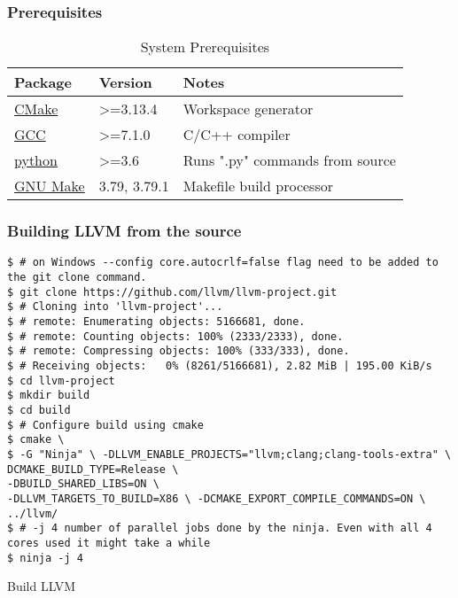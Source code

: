 \subsubsection{Prerequisites}

\begin{table}[H]
    \centering
    \begin{tabular}{|m{}|m{}| m{}|}
        \hline
        \textbf{Package} & \textbf{Version} & \textbf{Notes} \\ 
        \hline
        \href{https://cmake.org/}{CMake} & >=3.13.4	& Workspace generator \\ 
        \hline
        \href{https://gcc.gnu.org/}{GCC} & >=7.1.0 & C/C++ compiler \\ 
        \hline
        \href{https://python.com}{python} & >=3.6 & Runs ".py" commands from source  \\ 
        \hline
        \href{http://savannah.gnu.org/projects/make}{GNU Make} & 3.79, 3.79.1 & Makefile build processor \\ 
        \hline
    \end{tabular}
    \caption{System Prerequisites}
    \label{tab:prerequisites}
\end{table}


\subsubsection{Building LLVM from the source}

\begin{listing}[H]
\begin{verbatim}
$ # on Windows --config core.autocrlf=false flag need to be added to the git clone command.
$ git clone https://github.com/llvm/llvm-project.git
$ # Cloning into 'llvm-project'...
$ # remote: Enumerating objects: 5166681, done.
$ # remote: Counting objects: 100% (2333/2333), done.
$ # remote: Compressing objects: 100% (333/333), done.
$ # Receiving objects:   0% (8261/5166681), 2.82 MiB | 195.00 KiB/s
$ cd llvm-project
$ mkdir build 
$ cd build
$ # Configure build using cmake
$ cmake \
$ -G "Ninja" \ -DLLVM_ENABLE_PROJECTS="llvm;clang;clang-tools-extra" \  DCMAKE_BUILD_TYPE=Release \
-DBUILD_SHARED_LIBS=ON \
-DLLVM_TARGETS_TO_BUILD=X86 \ -DCMAKE_EXPORT_COMPILE_COMMANDS=ON \
../llvm/
$ # -j 4 number of parallel jobs done by the ninja. Even with all 4 cores used it might take a while
$ ninja -j 4
\end{verbatim}
\caption{Build LLVM}
\label{code:build-llvm-usr}
\end{listing}

